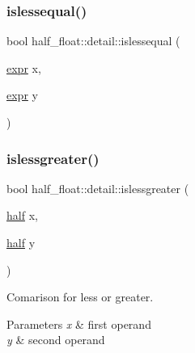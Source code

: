 \mbox{\label{namespacehalf__float_1_1detail_a403f2453b664076031e8dc915cc897e6}} 
\subsubsection{\texorpdfstring{islessequal()}{islessequal()}\hspace{0.1cm}{\footnotesize\ttfamily [4/4]}}
{\footnotesize\ttfamily bool half\+\_\+float\+::detail\+::islessequal (\begin{DoxyParamCaption}\item[{\hyperlink{structhalf__float_1_1detail_1_1expr}{expr}}]{x,  }\item[{\hyperlink{structhalf__float_1_1detail_1_1expr}{expr}}]{y }\end{DoxyParamCaption})\hspace{0.3cm}{\ttfamily [inline]}}

\mbox{\label{namespacehalf__float_1_1detail_a1c8c80126de214bbee6021d1d7ace69f}} 
\subsubsection{\texorpdfstring{islessgreater()}{islessgreater()}\hspace{0.1cm}{\footnotesize\ttfamily [1/4]}}
{\footnotesize\ttfamily bool half\+\_\+float\+::detail\+::islessgreater (\begin{DoxyParamCaption}\item[{\hyperlink{classhalf__float_1_1half}{half}}]{x,  }\item[{\hyperlink{classhalf__float_1_1half}{half}}]{y }\end{DoxyParamCaption})\hspace{0.3cm}{\ttfamily [inline]}}

Comarison for less or greater. 
\begin{DoxyParams}{Parameters}
{\em x} & first operand \\
\hline
{\em y} & second operand \\
\hline
\end{DoxyParams}

